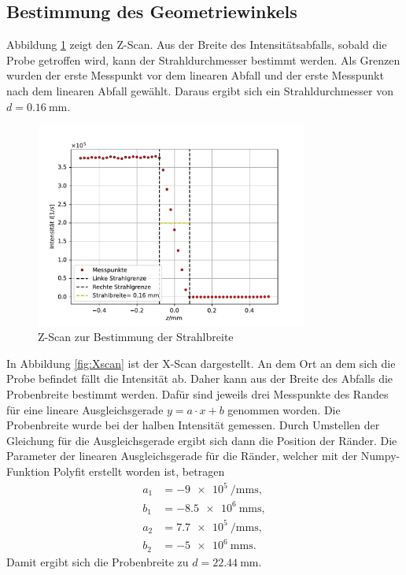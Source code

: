 \subsection{Bestimmung des Geometriewinkels}
Abbildung \ref{fig:Zscan} zeigt den Z-Scan. Aus der Breite des Intensitätsabfalls, sobald die Probe getroffen wird, 
kann der Strahldurchmesser bestimmt werden. 
Als Grenzen wurden der erste Messpunkt vor dem linearen Abfall und der erste Messpunkt nach dem linearen Abfall gewählt. 
Daraus ergibt sich ein Strahldurchmesser von $d=\SI{0.16}{\milli\meter}$.
\begin{figure}[H]
    \centering
    \includegraphics[width=0.8\textwidth]{plots/Zscan.pdf}
    \caption{Z-Scan zur Bestimmung der Strahlbreite}
    \label{fig:Zscan}
\end{figure}
In Abbildung \ref{fig:Xscan} ist der X-Scan dargestellt. An dem Ort an dem sich die Probe befindet fällt die Intensität ab. Daher kann aus der Breite des Abfalls die Probenbreite 
bestimmt werden. Dafür sind jeweils drei Messpunkte des Randes für eine lineare Ausgleichsgerade $y=a\cdot x+b$ genommen worden. Die Probenbreite wurde bei der halben Intensität gemessen.
Durch Umstellen der Gleichung für die Ausgleichsgerade ergibt sich dann die Position der Ränder. 
Die Parameter der linearen Ausgleichsgerade für die Ränder, welcher mit der Numpy-Funktion Polyfit erstellt worden ist, betragen
\begin{align*}
    a_1 &= \SI{-9e5}{\per\milli\meter\second}, \\
    b_1 &= \SI{-8.5e6}{\milli\meter\second}, \\
    a_2 &= \SI{7.7e5}{\per\milli\meter\second}, \\
    b_2 &= \SI{-5e6}{\milli\meter\second}.
\end{align*}
Damit ergibt sich die Probenbreite zu $d=\SI{22.44}{\milli\meter}$.
